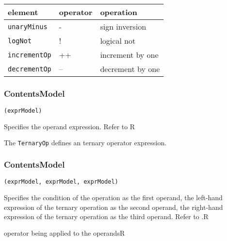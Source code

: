 \begin{tabular}{|l|p{4cm}|l|}
	\hline
	 element & operator & operation \\ \hline\hline
	 {\tt unaryMinus} & - & sign inversion \\ \hline 
	 {\tt logNot} & ! & logical not \\ \hline 
	 {\tt incrementOp} & ++ & increment by one \\ \hline 
	 {\tt decrementOp} & -- & decrement by one \\ \hline 
\end{tabular}

\subsubsection*{ContentsModel}{}

\begin{lstlisting}[style=default,frame=none]
(exprModel)
\end{lstlisting}

\begin{HIRChildElements}
	{Specifies the operand expression. Refer to }{R}
\end{HIRChildElements}


The {\tt TernaryOp} defines an ternary operator expression.

\subsubsection*{ContentsModel}{}

\begin{lstlisting}[style=default,frame=none]
(exprModel, exprModel, exprModel)
\end{lstlisting}

\begin{HIRChildElements}
	{Specifies the condition of the operation as the first operand, the 
	 left-hand expression of the ternary operation as the second 
	 operand, the right-hand expression of the ternary operation as the third 
	 operand. Refer to .}{R}
\end{HIRChildElements}

\begin{HIRAttributes}
	{operator being applied to the operands}{R}
\end{HIRAttributes}

